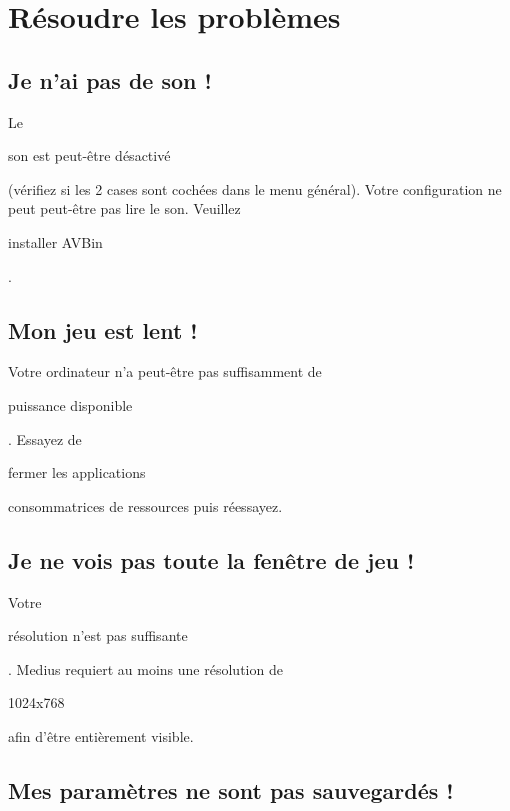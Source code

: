 \documentclass{article}
\begin{document}
\section{Résoudre les problèmes}

\subsection{Je n'ai pas de son !}

Le \begin{bfseries}son est peut-être désactivé\end{bfseries} (vérifiez si les 2 cases sont cochées dans le menu général).
\newline\newline
Votre configuration ne peut peut-être pas lire le son. Veuillez \begin{bfseries}installer AVBin\end{bfseries}.
\newline\newline

\subsection{Mon jeu est lent !}

Votre ordinateur n'a peut-être pas suffisamment de \begin{bfseries}puissance disponible\end{bfseries}. Essayez de \begin{bfseries}fermer les applications\end{bfseries} consommatrices de ressources puis réessayez.
\newline\newline

\subsection{Je ne vois pas toute la fenêtre de jeu !}

Votre \begin{bfseries}résolution n'est pas suffisante\end{bfseries}. Medius requiert au moins une résolution de \begin{bfseries}1024x768\end{bfseries} afin d'être entièrement visible.
\newline\newline

\subsection{Mes paramètres ne sont pas sauvegardés !}
\end{document}
